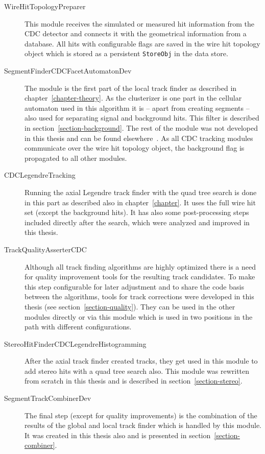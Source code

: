 \begin{description}
  \item[Wire\-Hit\-Topology\-Preparer] This module receives the simulated or measured hit information from the CDC detector and connects it with the geometrical information from a database. All hits with configurable flags are saved in the wire hit topology object which is stored as a persistent \texttt{StoreObj} in the data store.
  \item[Segment\-Finder\-CDC\-Facet\-Automaton\-Dev] The module is the first part of the local track finder as described in chapter~\ref{chapter-theory}. As the clusterizer is one part in the cellular automaton used in this algorithm it is -- apart from creating segments -- also used for separating signal and background hits. This filter is described in section~\ref{section-background}. The rest of the module was not developed in this thesis and can be found elsewhere~\cite{oliver}. As all CDC tracking modules communicate over the wire hit topology object, the background flag is propagated to all other modules.
  \item[CDC\-Legendre\-Tracking] Running the axial Legendre track finder with the quad tree search is done in this part as described also in chapter~\ref{chapter}. It uses the full wire hit set (except the background hits). It has also some post-processing steps included directly after the search, which were analyzed and improved in this thesis. 
  \item[Track\-Quality\-Asserter\-CDC] Although all track finding algorithms are highly optimized there is a need for quality improvement tools for the resulting track candidates. To make this step configurable for later adjustment and to share the code basis between the algorithms, tools for track corrections were developed in this thesis (see section~\ref{section-quality}). They can be used in the other modules directly or via this module which is used in two positions in the path with different configurations.
  \item[Stereo\-Hit\-Finder\-CDC\-Legendre\-Histogramming] After the axial track finder created tracks, they get used in this module to add stereo hits with a quad tree search also. This module was rewritten from scratch in this thesis and is described in section~\ref{section-stereo}.
  \item[Segment\-Track\-Combiner\-Dev] The final step (except for quality improvements) is the combination of the results of the global and local track finder which is handled by this module. It was created in this thesis also and is presented in section~\ref{section-combiner}.
\end{description}

